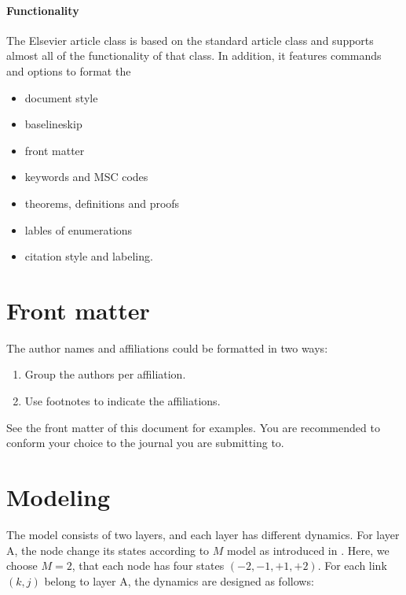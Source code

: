 \documentclass[review]{elsarticle}
\begin{document}
\paragraph{Functionality} The Elsevier article class is based on the standard article class and supports almost all of the functionality of that class. In addition, it features commands and options to format the
\begin{itemize}
\item document style
\item baselineskip
\item front matter
\item keywords and MSC codes
\item theorems, definitions and proofs
\item lables of enumerations
\item citation style and labeling.
\end{itemize}

\section{Front matter}

The author names and affiliations could be formatted in two ways:
\begin{enumerate}[(1)]
\item Group the authors per affiliation.
\item Use footnotes to indicate the affiliations.
\end{enumerate}
See the front matter of this document for examples. You are recommended to conform your choice to the journal you are submitting to.

\section{Modeling}
The model consists of two layers, and each layer has different dynamics. For layer A, the node change its states according to $M$ model as introduced in \cite{rocca2014}. Here, we choose $M=2$, that each node has four states $(-2, -1, +1, +2)$. For each link $(k, j)$ belong to layer A,  the dynamics are designed as follows:
\end{document}
